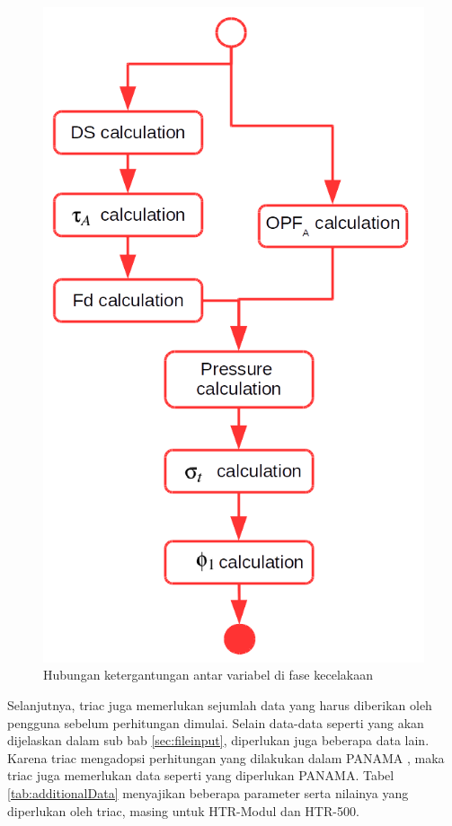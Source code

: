 \documentclass[a4paper,11pt]{report}
\begin{document}
\begin{figure}[h]
  \begin{center}
    \includegraphics[scale=.5]{pics/accCalculation.png}
    \caption{Hubungan ketergantungan antar variabel di fase kecelakaan}
    \label{fig:accident}
  \end{center}
\end{figure}

Selanjutnya, triac juga memerlukan sejumlah data yang harus diberikan oleh pengguna sebelum perhitungan dimulai. Selain data-data seperti yang akan dijelaskan dalam sub bab \ref{sec:fileinput}, diperlukan juga beberapa data lain. Karena triac mengadopsi perhitungan yang dilakukan dalam PANAMA \cite{report1}, maka triac juga memerlukan data seperti yang diperlukan PANAMA. Tabel \ref{tab:additionalData} menyajikan beberapa parameter serta nilainya yang diperlukan oleh triac, masing untuk HTR-Modul dan HTR-500.
\end{document}
